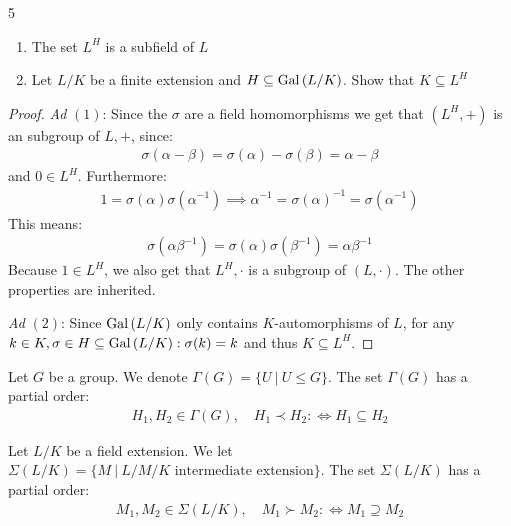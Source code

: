 \documentclass[twoside = false,	%
		headsepline,		%
		parskip = true,
		]{scrbook}						%
\begin{document}
        \begin{exercise}{}{5}
            \begin{enumerate}
                \item The set $L^H$ is a subfield of $L$
                \item Let $L/K$ be a finite extension and $H \subseteq \mathrm{Gal}\left( L/K\right)$. Show that $K \subseteq L^H$
            \end{enumerate}
        \end{exercise}
        \begin{proof}
            \textit{Ad} $(1)$: Since the $\sigma$ are a field homomorphisms we get that $(L^H,+)$ is an subgroup of $L,+$, since:
            \begin{align*}
                \sigma(\alpha - \beta) = \sigma(\alpha) - \sigma(\beta) = \alpha - \beta
            \end{align*}
            and $0 \in L^H$. Furthermore:
            \begin{align*}
                1 = \sigma(\alpha) \sigma (\alpha^{-1}) \implies \alpha^{-1} = \sigma(\alpha)^{-1} = \sigma (\alpha^{-1})
            \end{align*}
            This means:
            \begin{align*}
                \sigma(\alpha \beta^{-1}) = \sigma(\alpha) \sigma(\beta^{-1}) = \alpha \beta^{-1}
            \end{align*}
            Because $1 \in L^H$, we also get that $L^H,\cdot$ is a subgroup of $(L,\cdot)$. The other properties are inherited.
            
            \textit{Ad} $(2)$: Since $\mathrm{Gal}\left( L/K\right)$ only contains $K$-automorphisms of $L$, for any $k \in K, \sigma \in H \subseteq \mathrm{Gal}\left( L/K\right): \sigma(k) = k$ and thus $K \subseteq L^H$.
        \end{proof}
        
        Let $G$ be a group. We denote $\Gamma(G) = \{U \ | \ U \leq G\}$. The set $\Gamma(G)$ has a partial order:
        \begin{align*}
            H_1,H_2 \in \Gamma(G), \quad H_1 \prec H_2 :\Leftrightarrow H_1 \subseteq H_2
        \end{align*}
        
        Let $L/K$ be a field extension. We let $\Sigma(L/K) = \{M \ | \ L/M/K \text{ intermediate extension}\}$. The set $\Sigma(L/K)$ has a partial order:
        \begin{align*}
            M_1,M_2 \in \Sigma(L/K), \quad M_1 \succ M_2 :\Leftrightarrow M_1 \supseteq M_2
        \end{align*}
        
\end{document}
